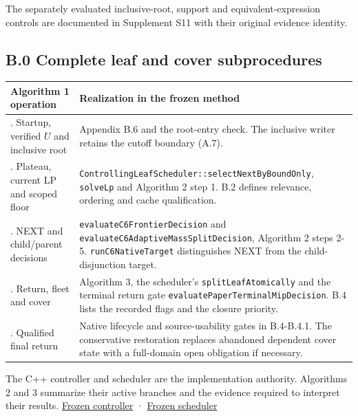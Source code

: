 \documentclass[
  american,
  11pt,
]{article}
\newcounter{none} %
\begin{document}
The separately evaluated inclusive-root, support and
equivalent-expression controls are documented in Supplement S11 with
their original evidence identity.

\subsection{B.0 Complete leaf and cover
subprocedures}\label{b.0-complete-leaf-and-cover-subprocedures}

{\def\LTcaptype{none} %
\begin{longtable}[]{@{}
  >{\raggedright\arraybackslash}p{}
  >{\raggedright\arraybackslash}p{}@{}}
\toprule\noalign{}
\begin{minipage}[b]{\linewidth}\raggedright
Algorithm 1 operation
\end{minipage} & \begin{minipage}[b]{\linewidth}\raggedright
Realization in the frozen method
\end{minipage} \\
\midrule\noalign{}
\endhead
\bottomrule\noalign{}
\endlastfoot
1. Startup, verified \(U\) and inclusive root & Appendix B.6 and the
root-entry check. The inclusive writer retains the cutoff boundary
(A.7). \\
2. Plateau, current LP and scoped floor &
\texttt{ControllingLeafScheduler::selectNextByBoundOnly},
\texttt{solveLp} and Algorithm 2 step 1. B.2 defines
relevance, ordering and cache qualification. \\
3. NEXT and child/parent decisions &
\texttt{evaluateC6FrontierDecision} and
\texttt{evaluateC6AdaptiveMassSplitDecision}, Algorithm
2 steps 2-5. \texttt{runC6NativeTarget} distinguishes
NEXT from the child-disjunction target. \\
4. Return, fleet and cover & Algorithm 3, the scheduler's
\texttt{splitLeafAtomically} and the terminal return
gate \texttt{evaluatePaperTerminalMipDecision}. B.4
lists the recorded flags and the closure priority. \\
5. Qualified final return & Native lifecycle and source-usability gates
in B.4-B.4.1. The conservative restoration replaces abandoned dependent
cover state with a full-domain open obligation if necessary. \\
\end{longtable}
}

The C++ controller and scheduler are the implementation authority.
Algorithms 2 and 3 summarize their active branches and the evidence
required to interpret their results.
\href{https://github.com/yifanXovo/TailoredExact/blob/781c548b410a2749190e3f0c4b149c2ad885c054/src/PaperExternalGiniTree.cpp}{Frozen
controller} ·
\href{https://github.com/yifanXovo/TailoredExact/blob/781c548b410a2749190e3f0c4b149c2ad885c054/src/ControllingLeafScheduler.cpp}{Frozen
scheduler}
\end{document}
